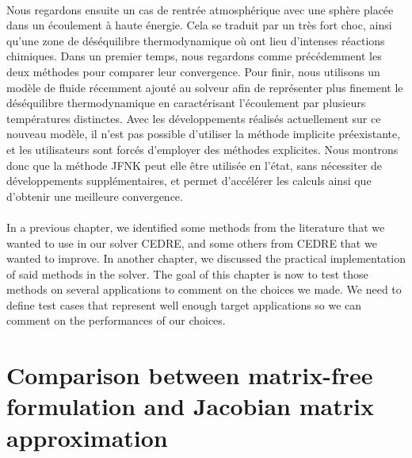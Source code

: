 \begin{tcolorbox}[title=Résumé du chapitre : Analyse de la méthode JFNK dans CEDRE, colframe=black!50!white]
  \paragraph{}
  Nous regardons ensuite un cas de rentrée atmosphérique avec une sphère placée dans un écoulement à haute énergie.
  Cela se traduit par un très fort choc, ainsi qu'une zone de déséquilibre thermodynamique où ont lieu d'intenses réactions chimiques.
  Dans un premier temps, nous regardons comme précédemment les deux méthodes pour comparer leur convergence.
  Pour finir, nous utilisons un modèle de fluide récemment ajouté au solveur afin de représenter plus finement le déséquilibre thermodynamique en caractérisant l'écoulement par plusieurs températures distinctes.
  Avec les développements réalisés actuellement sur ce nouveau modèle, il n'est pas possible d'utiliser la méthode implicite préexistante, et les utilisateurs sont forcés d'employer des méthodes explicites.
  Nous montrons donc que la méthode JFNK peut elle être utilisée en l'état, sans nécessiter de développements supplémentaires, et permet d'accélérer les calculs ainsi que d'obtenir une meilleure convergence.
\end{tcolorbox}


  \paragraph{}
  In a previous chapter, we identified some methods from the literature that we wanted to use in our solver CEDRE, and some others from CEDRE that we wanted to improve.
  In another chapter, we discussed the practical implementation of said methods in the solver.
  The goal of this chapter is now to test those methods on several applications to comment on the choices we made.
  We need to define test cases that represent well enough target applications so we can comment on the performances of our choices.


  \section{Comparison between matrix-free formulation and Jacobian matrix approximation}

